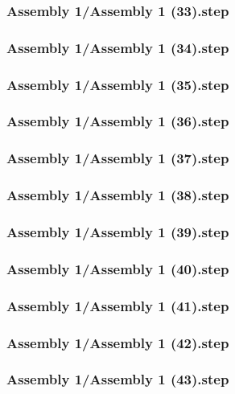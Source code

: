 \documentclass[a4paper,12pt]{article}
\begin{document}
\subsubsection{Assembly 1/Assembly 1 (33).step}

\subsubsection{Assembly 1/Assembly 1 (34).step}

\subsubsection{Assembly 1/Assembly 1 (35).step}

\subsubsection{Assembly 1/Assembly 1 (36).step}

\subsubsection{Assembly 1/Assembly 1 (37).step}

\subsubsection{Assembly 1/Assembly 1 (38).step}

\subsubsection{Assembly 1/Assembly 1 (39).step}

\subsubsection{Assembly 1/Assembly 1 (40).step}

\subsubsection{Assembly 1/Assembly 1 (41).step}

\subsubsection{Assembly 1/Assembly 1 (42).step}

\subsubsection{Assembly 1/Assembly 1 (43).step}

\end{document}
